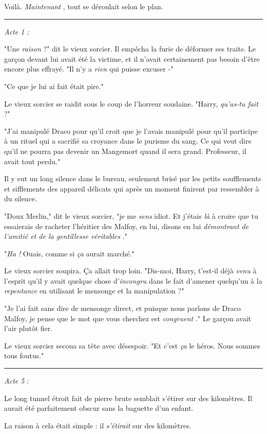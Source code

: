 Voilà. \emph{Maintenant} , tout se déroulait selon le plan.
\par\noindent\rule{\textwidth}{0.4pt}
\emph{Acte 1 :} 

"Une \emph{raison}  ?" dit le vieux sorcier. Il empêcha la furie de déformer ses traits. Le garçon devant lui avait été la victime, et il n'avait certainement pas besoin d'être encore plus effrayé. "Il n'y a \emph{rien} qui puisse excuser -"

"Ce que je lui ai fait était pire."

Le vieux sorcier se raidit sous le coup de l'horreur soudaine. "Harry, \emph{qu'as-tu fait} ?"

"J'ai manipulé Draco pour qu'il croit que je l'avais manipulé pour qu'il participe à un rituel qui a sacrifié sa croyance dans le purisme du sang. Ce qui veut dire qu'il ne pourra pas devenir un Mangemort quand il sera grand. Professeur, il avait tout perdu."

Il y eut un long silence dans le bureau, seulement brisé par les petits soufflements et sifflements des appareil délicats qui après un moment finirent par ressembler à du silence.

"Doux Merlin," dit le vieux sorcier, "je me \emph{sens}  idiot. Et j'étais \emph{là}  à croire que tu essaierais de racheter l'héritier des Malfoy, en lui, disons en lui \emph{démontrant de l'amitié et de la gentillesse véritables} ."

"\emph{Ha !}  Ouais, comme si \emph{ça} aurait marché."

Le vieux sorcier soupira. Ça allait trop loin. "Dis-moi, Harry, t'est-il déjà \emph{venu } à l'esprit qu'il y avait quelque chose d'\emph{incongru}  dans le fait d'amener quelqu'un à la \emph{repentance} en utilisant le mensonge et la manipulation ?"

"Je l'ai fait sans dire de mensonge direct, et puisque nous parlons de Draco Malfoy, je pense que le mot que vous cherchez est \emph{congruent} ." Le garçon avait l'air plutôt fier.

Le vieux sorcier secoua sa tête avec désespoir. "Et c'est \emph{ça} le héros. Nous sommes tous foutus."
\par\noindent\rule{\textwidth}{0.4pt}
\emph{Acte 5} :

Le long tunnel étroit fait de pierre brute semblait s'étirer sur des kilomètres. Il aurait été parfaitement obscur sans la baguette d'un enfant.

La raison à cela était simple : il \emph{s'étirait} sur des kilomètres.

